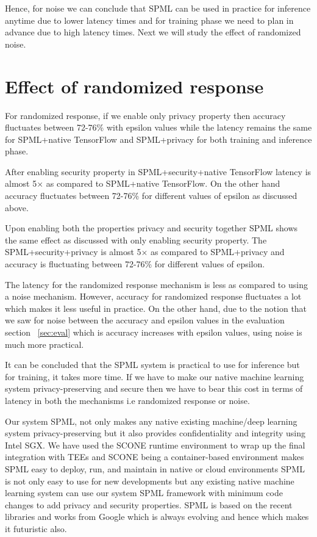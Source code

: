 Hence, for noise we can conclude that SPML can be used in practice for inference anytime due to lower latency times and for training phase we need to plan in advance due to high latency times. Next we will study the effect of randomized noise.

\section{Effect of randomized response}
For randomized response, if we enable only privacy property then accuracy fluctuates between 72-76\% with epsilon values while the latency remains the same for SPML+native TensorFlow and SPML+privacy for both training and inference phase.

After enabling security property in SPML+security+native TensorFlow latency is almost 5$\times$ as compared to SPML+native TensorFlow. On the other hand accuracy fluctuates between 72-76\% for different values of epsilon as discussed above.

Upon enabling both the properties privacy and security together SPML shows the same effect as discussed with only enabling security property. The SPML+security+privacy is almost 5$\times$ as compared to SPML+privacy and accuracy is fluctuating between 72-76\% for different values of epsilon.

The latency for the randomized response mechanism is less as compared to using a noise mechanism. However, accuracy for randomized response fluctuates a lot which makes it less useful in practice. On the other hand, due to the notion that we saw for noise between the accuracy and epsilon values in the evaluation section ~\ref{sec:eval} which is accuracy increases with epsilon values, using noise is much more practical. 

It can be concluded that the SPML system is practical to use for inference but for training, it takes more time. If we have to make our native machine learning system privacy-preserving and secure then we have to bear this cost in terms of latency in both the mechanisms i.e randomized response or noise.

Our system SPML, not only makes any native existing machine/deep learning system privacy-preserving but it also provides confidentiality and integrity using Intel SGX. We have used the SCONE runtime environment to wrap up the final integration with TEEs and SCONE being a container-based environment makes SPML easy to deploy, run, and maintain in native or cloud environments
SPML is not only easy to use for new developments but any existing native machine learning system can use our system SPML framework with minimum code changes to add privacy and security properties. SPML is based on the recent libraries and works from Google which is always evolving and hence which makes it futuristic also.



